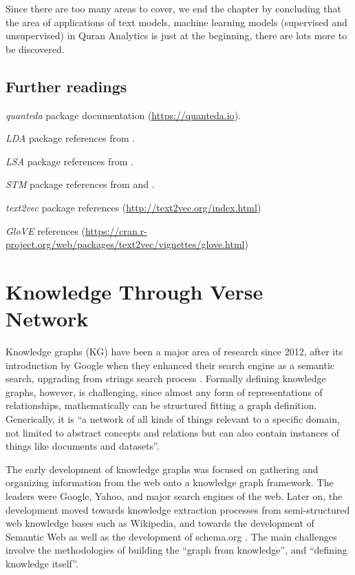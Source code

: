 \documentclass[
]{article}
\begin{document}
Since there are too many areas to cover, we end the chapter by concluding that the area of applications of text models, machine learning models (supervised and unsupervised) in Quran Analytics is just at the beginning, there are lots more to be discovered.

\hypertarget{further-readings-7}{%
\subsection{Further readings}\label{further-readings-7}}

\emph{quanteda} package documentation (\url{https://quanteda.io}).

\emph{LDA} package references from \citep{blei2003}.

\emph{LSA} package references from \citep{landauer1998}.

\emph{STM} package references from \citep{roberts2014} and \citep{roberts2019}.

\emph{text2vec} package references (\url{http://text2vec.org/index.html})

\emph{GloVE} references (\url{https://cran.r-project.org/web/packages/text2vec/vignettes/glove.html})

\hypertarget{knowledge-through-verse-network}{%
\section{Knowledge Through Verse Network}\label{knowledge-through-verse-network}}

Knowledge graphs (KG) have been a major area of research since 2012, after its introduction by Google when they enhanced their search engine as a semantic search, upgrading from strings search process \citep{googlekg2012}. Formally defining knowledge graphs, however, is challenging, since almost any form of representations of relationships, mathematically can be structured fitting a graph definition. Generically, it is ``a network of all kinds of things relevant to a specific domain, not limited to abstract concepts and relations but can also contain instances of things like documents and datasets''\citep{blumauer2016}.

The early development of knowledge graphs was focused on gathering and organizing information from the web onto a knowledge graph framework. The leaders were Google, Yahoo, and major search engines of the web. Later on, the development moved towards knowledge extraction processes from semi-structured web knowledge bases such as Wikipedia, and towards the development of Semantic Web as well as the development of schema.org \citep{paulheim2016}. The main challenges involve the methodologies of building the ``graph from knowledge'', and ``defining knowledge itself''.
\end{document}
